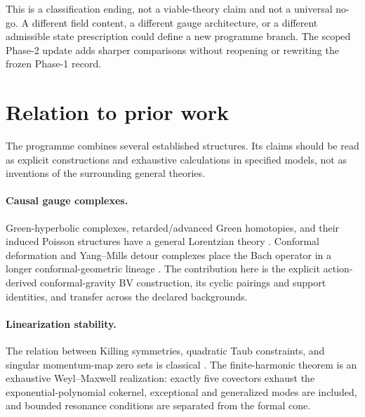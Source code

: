 \documentclass[11pt]{article}
\begin{document}
This is a classification ending, not a viable-theory claim and not a
universal no-go.  A different field content, a different gauge architecture,
or a different admissible state prescription could define a new programme
branch.  The scoped Phase-2 update adds sharper comparisons without reopening
or rewriting the frozen Phase-1 record.

\section{Relation to prior work}

The programme combines several established structures.  Its claims should be
read as explicit constructions and exhaustive calculations in specified
models, not as inventions of the surrounding general theories.

\paragraph{Causal gauge complexes.}
Green-hyperbolic complexes, retarded/advanced Green homotopies, and their
induced Poisson structures have a general Lorentzian theory
\cite{BeniniMusanteSchenkel}.  Conformal deformation and Yang--Mills detour
complexes place the Bach operator in a longer conformal-geometric lineage
\cite{BransonGover,GoverSombergSoucek}.  The contribution here is the explicit
action-derived conformal-gravity BV construction, its cyclic pairings and
support identities, and transfer across the declared backgrounds.

\paragraph{Linearization stability.}
The relation between Killing symmetries, quadratic Taub constraints, and
singular momentum-map zero sets is classical
\cite{BrillDeser,FischerMarsden,Moncrief,AMM}.  The finite-harmonic theorem is
an exhaustive Weyl--Maxwell realization: exactly five covectors exhaust the
exponential-polynomial cokernel, exceptional and generalized modes are
included, and bounded resonance conditions are separated from the formal
cone.
\end{document}
